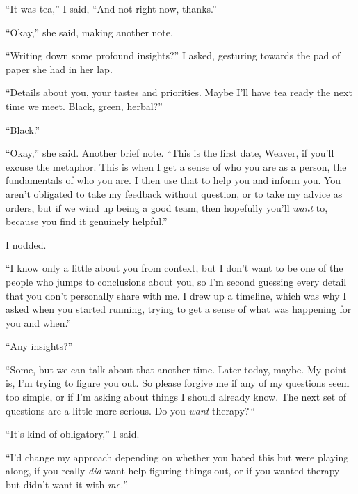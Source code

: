 ``It was tea,'' I said, ``And not right now, thanks.''



``Okay,'' she said, making another note.



``Writing down some profound insights?'' I asked, gesturing towards the pad of paper she had in her lap.



``Details about you, your tastes and priorities.  Maybe I'll have tea ready the next time we meet.  Black, green, herbal?''



``Black.''



``Okay,'' she said.  Another brief note.  ``This is the first date, Weaver, if you'll excuse the metaphor.  This is when I get a sense of who you are as a person, the fundamentals of who you are.  I then use that to help you and inform you.  You aren't obligated to take my feedback without question, or to take my advice as orders, but if we wind up being a good team, then hopefully you'll \emph{ want} to, because you find it genuinely helpful.''



I nodded.



``I know only a little about you from context, but I don't want to be one of the people who jumps to conclusions about you, so I'm second guessing every detail that you don't personally share with me.  I drew up a timeline, which was why I asked when you started running, trying to get a sense of what was happening for you and when.''



``Any insights?''



``Some, but we can talk about that another time.  Later today, maybe.  My point is, I'm trying to figure you out.  So please forgive me if any of my questions seem too simple, or if I'm asking about things I should already know.  The next set of questions are a little more serious.  Do you \emph{want }therapy?\emph{``}



``It's kind of obligatory,'' I said.



``I'd change my approach depending on whether you hated this but were playing along, if you really \emph{did} want help figuring things out, or if you wanted therapy but didn't want it with \emph{me.}''



